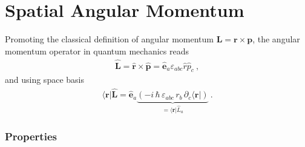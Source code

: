 \documentclass[letterpaper,10pt,english]{jupyterBook}
\begin{document}
\section{Spatial Angular Momentum}
\label{\detokenize{ch/quantum-mechanics/angular-momentum/angular-momentum-spatial:spatial-angular-momentum}}\label{\detokenize{ch/quantum-mechanics/angular-momentum/angular-momentum-spatial:quantum-mechanics-angular-momentum-spatial}}\label{\detokenize{ch/quantum-mechanics/angular-momentum/angular-momentum-spatial::doc}}
\sphinxAtStartPar
Promoting the classical definition of angular momentum \(\mathbf{L} = \mathbf{r} \times \mathbf{p}\), the angular momentum operator in quantum mechanics reads
\begin{equation*}
\begin{split}\hat{\mathbf{L}} = \hat{\mathbf{r}} \times \hat{\mathbf{p}} = \hat{\mathbf{e}}_a \varepsilon_{abc} \hat{r} \hat{p}_c \ ,\end{split}
\end{equation*}
\sphinxAtStartPar
and using space basis
\begin{equation*}
\begin{split}\langle \mathbf{r} | \hat{\mathbf{L}} = \hat{\mathbf{e}}_a \underbrace{\left( - i \, \hbar \, \varepsilon_{abc}\, r_b \, \partial_c \langle \mathbf{r} | \right) }_{= \langle \mathbf{r} | \hat{L}_a }\ .\end{split}
\end{equation*}\subsubsection*{Properties}
\end{document}
